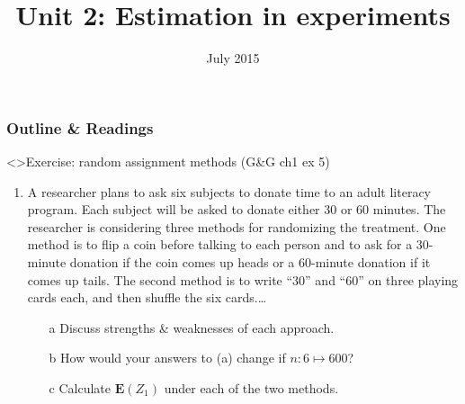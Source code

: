 

%

%






\title{Unit 2: Estimation in experiments}
\date{July 2015}




  \begin{frame}
    \frametitle{Outline \& Readings}

\tableofcontents[subsectionstyle=show/hide/hide]

\end{frame}


\begin{frame}<\nottheirhandout>{Exercise: random assignment methods}
{\footnotesize (G\&G ch1 ex 5)}

\begin{enumerate} \addtocounter{enumi}{-1}
\item
A researcher plans to ask six subjects to donate time to an adult
literacy program. Each subject will be asked to donate either 30 or 60
minutes. The researcher is considering three methods for randomizing
the treatment. One method is to flip a coin before talking to each
person and to ask for a 30-minute donation if the coin comes up heads
or a 60-minute donation if it comes up tails. The second method is to
write ``30'' and ``60'' on three playing cards each, and then shuffle
the six cards.\ldots
  
\begin{itemize}
\item[a] Discuss strengths \& weaknesses of each approach.
\item[b] How would your answers to (a) change if $n: 6 \mapsto 600$?
\item[c] Calculate $\mathbf{E}(Z_{1})$ under each of the two methods.
\end{itemize}
\end{enumerate}

\end{frame}


